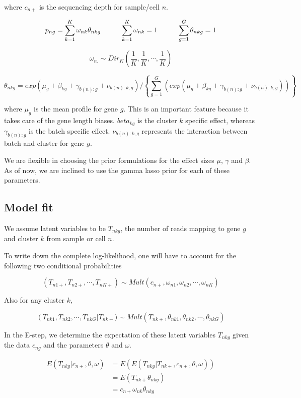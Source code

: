\documentclass[a4paper, 12pt]{article}
\begin{document}
where $c_{n+}$ is the sequencing depth for sample/cell $n$. 

$$ p_{ng} = \sum_{k=1}^{K} \omega_{nk} \theta_{nkg} \hspace{1 cm} \sum_{k=1}^{K} \omega_{nk} = 1 \hspace{1 cm} \sum_{g=1}^{G} \theta_{nkg} = 1 $$

$$ \omega_{n.} \sim Dir_{K} \left ( \frac{1}{K}, \frac{1}{K}, \cdots, \frac{1}{K} \right ) $$

$$ \theta_{nkg} = exp \left( \mu_{g} + \beta_{kg} + \gamma_{b(n):g} + \nu_{b(n):k, g}\right)/ \left \{ \sum_{g=1}^{G} \left ( exp \left( \mu_{g} + \beta_{kg} + \gamma_{b(n):g}  + \nu_{b(n):k, g} \right) \right) \right \} $$

where $\mu_{g}$ is the mean profile for gene $g$. This is an important feature because it takes care of the gene length biases. $beta_{kg}$ is the cluster $k$ specific effect, whereas $\gamma_{b(n):g}$ is the batch specific effect. $\nu_{b(n):k, g}$ represents the interaction between batch and cluster for gene $g$.

We are flexible in choosing the prior formulations for the effect sizes $\mu$, $\gamma$ and $\beta$. As of now, we are inclined to use the gamma lasso prior for each of these parameters. 


\subsection{Model fit}

We assume latent variables to be $T_{nkg}$, the number of reads mapping to gene $g$ and cluster $k$ from sample or cell $n$.

To write down the complete log-likelihood, one will have to account for the following two conditional probabilities  

$$ \left ( T_{n1+}, T_{n2+}, \cdots, T_{nK+} \right) \sim Mult \left ( c_{n+}, \omega_{n1}, \omega_{n2}, \cdots, \omega_{nK} \right) $$

Also for any cluster $k$,

$$ \left(T_{nk1}, T_{nk2}, \cdots, T_{nkG} \right  | T_{nk+}) \sim Mult \left ( T_{nk+}, \theta_{nk1}, \theta_{nk2}, \cdots, \theta_{nkG} \right) $$


In the E-step, we determine the expectation of these latent variables $T_{nkg}$ given the data $c_{ng}$ and the parameters $\theta$ and $\omega$. 

\begin{align*}
E \left ( T_{nkg} | c_{n+}, \theta, \omega \right )  & = E \left(E \left (T_{nkg} | T_{nk+}, c_{n+}, \theta, \omega \right) \right ) \\
& = E \left (T_{nk+} \theta_{nkg} \right) \\
& = c_{n+} \omega_{nk} \theta_{nkg} \\
\end{align*}
\end{document}
